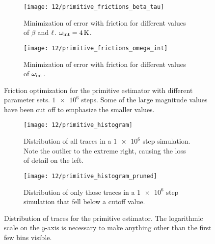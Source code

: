 \begin{figure}
	\setlength{\figspacing}{5 mm}
	\centering
	\begin{subfigure}[b]{\textwidth}
		\texttt{[image: 12/primitive\_frictions\_beta\_tau]}
		\caption{
			Minimization of error with friction for different values of $\beta$ and $\ell$.
			$\omega_\text{int} = \SI{4}{\kelvin}$.
		}
		\label{fig:primitive-frictions-beta-tau}
		\vspace{\figspacing}
	\end{subfigure}
	\begin{subfigure}[b]{\textwidth}
		\texttt{[image: 12/primitive\_frictions\_omega\_int]}
		\caption{
			Minimization of error with friction for different values of $\omega_\text{int}$.
		}
		\label{fig:primitive-frictions-omega-int}
	\end{subfigure}
	\caption[
		Friction optimization for primitive estimator
	]{
		Friction optimization for the primitive estimator with different parameter sets.
		$\num{1e6}$ steps.
		Some of the large magnitude values have been cut off to emphasize the smaller values.
	}
	\label{fig:primitive-frictions-parameters}
\end{figure}

\begin{figure}
	\setlength{\figspacing}{5 mm}
	\centering
	\begin{subfigure}[b]{\textwidth}
		\texttt{[image: 12/primitive\_histogram]}
		\caption{
			Distribution of all traces in a $\num{1e6}$ step simulation.
			Note the outlier to the extreme right, causing the loss of detail on the left.
		}
		\vspace{\figspacing}
	\end{subfigure}
	\begin{subfigure}[b]{\textwidth}
		\texttt{[image: 12/primitive\_histogram\_pruned]}
		\caption{
			Distribution of only those traces in a $\num{1e6}$ step simulation that fell below a cutoff value.
		}
	\end{subfigure}
	\caption[
		Distribution of traces for primitive estimator
	]{
		Distribution of traces for the primitive estimator.
		The logarithmic scale on the $y$-axis is necessary to make anything other than the first few bins visible.
	}
	\label{fig:primitive-histogram}
\end{figure}

